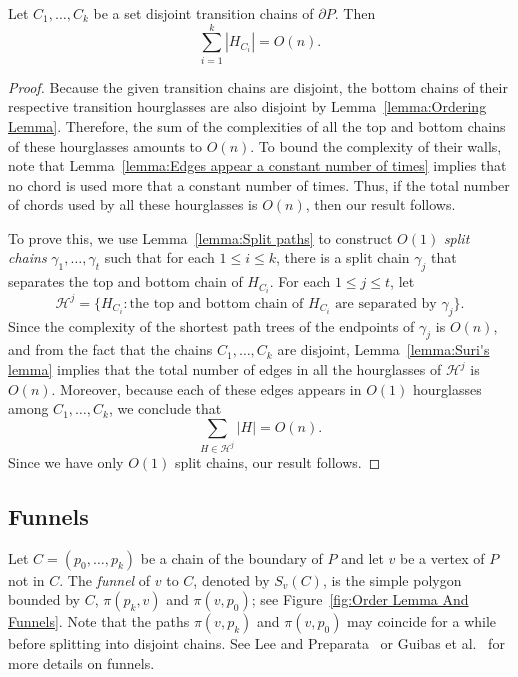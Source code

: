 \documentclass[a4paper,UKenglish]{lipics}
\newcommand{\fn}[2]{\ensuremath{S_{\scriptscriptstyle #1}(#2)}}
\newcommand{\p}[2]{\ensuremath{\pi(#1, #2)}}
\begin{document}
\begin{lemma}\label{lemma:Bounding complexity of transition hourglasses}
Let $C_1, \ldots, C_k$ be a set disjoint transition chains of $\partial P$. 
Then $$\sum_{i=1}^k |H_{C_i}| = O(n).$$
\end{lemma}
\begin{proof}

Because the given transition chains are disjoint, the bottom chains of their respective transition hourglasses are also disjoint by Lemma~\ref{lemma:Ordering Lemma}. Therefore, the sum of the complexities of all the top and bottom chains of these hourglasses amounts to $O(n)$. 
To bound the complexity of their walls, note that
Lemma~\ref{lemma:Edges appear a constant number of times} implies that no chord is used more that a constant number of times. Thus, if the total number of chords used by all these hourglasses is $O(n)$, then our result follows. 

To prove this, we use Lemma~\ref{lemma:Split paths} to construct $O(1)$ \emph{split chains} $\gamma_1, \ldots, \gamma_t$ such that for each $1\leq i\leq k$, there is a split chain $\gamma_j$ that separates the top and bottom chain of $H_{C_i}$.
For each $1\leq j\leq t$, let $$\mathcal H^j = \{H_{C_i} : \text{the top and bottom chain of $H_{C_i}$ are separated by }\gamma_j\}.$$
Since the complexity of the shortest path trees of the endpoints of $\gamma_j$ is $O(n)$,
and from the fact that the chains $C_1, \ldots, C_k$ are disjoint,  Lemma~\ref{lemma:Suri's lemma} implies that
the total number of edges in all the hourglasses of $\mathcal H^j$ is $O(n)$. Moreover, because each of these edges appears in $O(1)$ hourglasses among $C_1, \ldots, C_k$, we conclude that 
$$\sum_{H \in \mathcal H^j } |H| = O(n).$$
Since we have only $O(1)$ split chains, our result follows.
\end{proof}

\subsection{Funnels}

Let $C = (p_0, \ldots, p_k)$ be a chain of the boundary of $P$ and let $v$ be a vertex of $P$ not in $C$.
The \emph{funnel} of $v$ to $C$, denoted by $\fn{v}{C}$, is the simple polygon bounded by $C$, $\p{p_k}{v}$ and $\p{v}{p_0}$; see Figure~\ref{fig:Order Lemma And Funnels}. 
Note that the paths $\p{v}{p_k}$ and $\p{v}{p_0}$ may coincide for a while before splitting into disjoint chains. 
See Lee and Preparata~\cite{lee1984euclidean} or Guibas et al.~\cite{guibasShortestPathTree} for more details on funnels.
\end{document}
